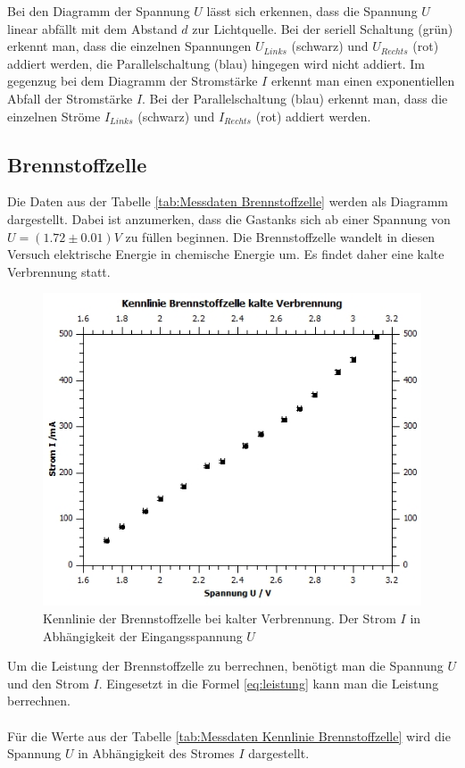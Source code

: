\documentclass[12pt,a4paper,twoside]{article}
\begin{document}
\noindent
Bei den Diagramm der Spannung $U$ lässt sich erkennen, dass die Spannung $U$ linear abfällt mit dem Abstand $d$ zur Lichtquelle. Bei der seriell Schaltung (grün) erkennt man, dass die einzelnen Spannungen $U_{Links}$ (schwarz) und $U_{Rechts}$ (rot) addiert werden, die Parallelschaltung (blau) hingegen wird nicht addiert. 
Im gegenzug bei dem Diagramm der Stromstärke $I$ erkennt man einen exponentiellen Abfall der Stromstärke $I$. Bei der Parallelschaltung (blau) erkennt man, dass die einzelnen Ströme $I_{Links}$ (schwarz) und $I_{Rechts}$ (rot) addiert werden. 

\subsection{Brennstoffzelle}
Die Daten aus der Tabelle \ref{tab:Messdaten Brennstoffzelle} werden als Diagramm dargestellt. Dabei ist anzumerken, dass die Gastanks sich ab einer Spannung von $U = (1.72 \pm 0.01)V$ zu füllen beginnen. 
Die Brennstoffzelle wandelt in diesen Versuch elektrische Energie in chemische Energie um. Es findet daher eine kalte Verbrennung statt. 

\begin{figure}[H]
    \centering
    \includegraphics[width=0.6\linewidth]{nudes/brennstoff diagramm i-u.jpg}
    \caption{Kennlinie der Brennstoffzelle bei kalter Verbrennung. Der Strom $I$ in Abhängigkeit der Eingangsspannung $U$}
    \label{fig:diagramm Brennstoffzelle I-U}
\end{figure}

\noindent
Um die Leistung der Brennstoffzelle zu berrechnen, benötigt man die Spannung $U$ und den Strom $I$. 
Eingesetzt in die Formel \ref{eq:leistung} kann man die Leistung berrechnen. 
\\
\\
Für die Werte aus der Tabelle \ref{tab:Messdaten Kennlinie Brennstoffzelle} wird die Spannung $U$ in Abhängigkeit des Stromes $I$ dargestellt. 
\end{document}
